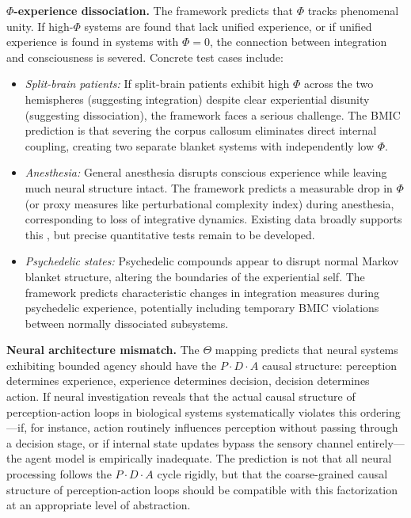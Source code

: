 \documentclass[11pt,a4paper]{article}
\theoremstyle{definition}
\theoremstyle{plain}
\theoremstyle{remark}
\begin{document}
\textbf{$\Phi$-experience dissociation.} The framework predicts that $\Phi$ tracks phenomenal unity. If high-$\Phi$ systems are found that lack unified experience, or if unified experience is found in systems with $\Phi = 0$, the connection between integration and consciousness is severed. Concrete test cases include:
\begin{itemize}
    \item \textit{Split-brain patients:} If split-brain patients exhibit high $\Phi$ across the two hemispheres (suggesting integration) despite clear experiential disunity (suggesting dissociation), the framework faces a serious challenge. The BMIC prediction is that severing the corpus callosum eliminates direct internal coupling, creating two separate blanket systems with independently low $\Phi$.
    \item \textit{Anesthesia:} General anesthesia disrupts conscious experience while leaving much neural structure intact. The framework predicts a measurable drop in $\Phi$ (or proxy measures like perturbational complexity index) during anesthesia, corresponding to loss of integrative dynamics. Existing data broadly supports this \citep{Tononi2015}, but precise quantitative tests remain to be developed.
    \item \textit{Psychedelic states:} Psychedelic compounds appear to disrupt normal Markov blanket structure, altering the boundaries of the experiential self. The framework predicts characteristic changes in integration measures during psychedelic experience, potentially including temporary BMIC violations between normally dissociated subsystems.
\end{itemize}

\textbf{Neural architecture mismatch.} The $\Theta$ mapping predicts that neural systems exhibiting bounded agency should have the $P \cdot D \cdot A$ causal structure: perception determines experience, experience determines decision, decision determines action. If neural investigation reveals that the actual causal structure of perception-action loops in biological systems systematically violates this ordering---if, for instance, action routinely influences perception without passing through a decision stage, or if internal state updates bypass the sensory channel entirely---the agent model is empirically inadequate. The prediction is not that all neural processing follows the $P \cdot D \cdot A$ cycle rigidly, but that the coarse-grained causal structure of perception-action loops should be compatible with this factorization at an appropriate level of abstraction.
\end{document}
